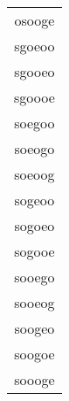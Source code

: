 \documentclass{article}
\begin{document}
\begin{center}
{\begin{tabular}{| c |}
osooge\\ 
sgoeoo\\ 
sgooeo\\ 
sgoooe\\ 
soegoo\\ 
soeogo\\ 
soeoog\\ 
sogeoo\\ 
sogoeo\\ 
sogooe\\ 
sooego\\ 
sooeog\\ 
soogeo\\ 
soogoe\\ 
soooge\\
  \hline
\end{tabular}}
\end{center}
\end{document}
